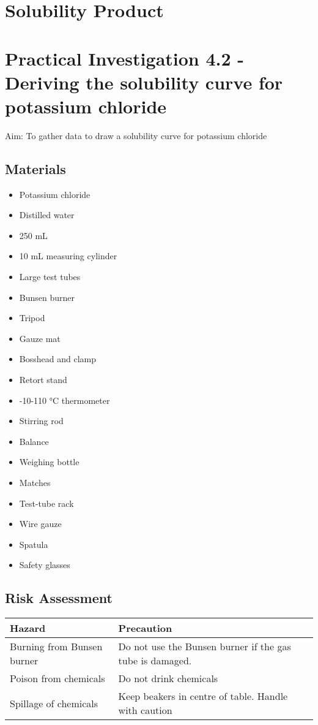 \section{Solubility Product}


\section{Practical Investigation 4.2 - Deriving the solubility curve for potassium chloride}
	Aim: To gather data to draw a solubility curve for potassium chloride

	\subsection{Materials}
		\begin{itemize}
			\item Potassium chloride
			\item Distilled water
			\item 250 mL
			\item 10 mL measuring cylinder
			\item Large test tubes
			\item Bunsen burner
			\item Tripod
			\item Gauze mat
			\item Bosshead and clamp
			\item Retort stand
			\item -10-110 $\unit{\degreeCelsius}$ thermometer
			\item Stirring rod
			\item Balance
			\item Weighing bottle
			\item Matches
			\item Test-tube rack
			\item Wire gauze
			\item Spatula
			\item Safety glasses
		\end{itemize}

	\subsection{Risk Assessment}
		\begin{table}[H]
			\centering
			\begin{tabular}{ll}
				\hline
				Hazard & Precaution \\ \hline
				Burning from Bunsen burner & Do not use the Bunsen burner if the gas tube is damaged. \\
				Poison from chemicals & Do not drink chemicals \\
				Spillage of chemicals & Keep beakers in centre of table. Handle with caution
			\end{tabular}
		\end{table}

